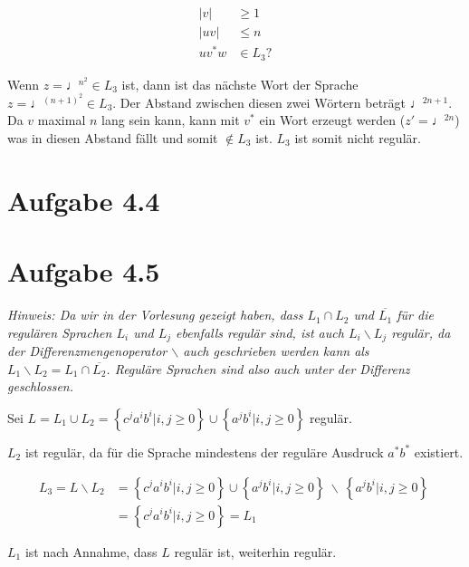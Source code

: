 \documentclass{article}
\begin{document}
\begin{align}
|v| &\geq 1\\
|uv| &\leq n\\
uv^*w &\in L_3 ?
\end{align}

Wenn $z=\quarternote^{n^2} \in L_3$ ist, dann ist das nächste Wort der Sprache $z=\quarternote^{(n+1)^2} \in L_3$. Der Abstand zwischen diesen zwei Wörtern beträgt $\quarternote^{2n+1}$. Da $v$ maximal $n$ lang sein kann, kann mit $v^*$ ein Wort erzeugt werden ($z'=\quarternote^{2n}$) was in diesen Abstand fällt und somit $\notin L_3$ ist. $L_3$ ist somit nicht regulär.



\section*{Aufgabe 4.4}



\section*{Aufgabe 4.5}
\textit{Hinweis: Da wir in der Vorlesung gezeigt haben, dass $L_1 \cap L_2$ und $\overline{L_1}$ für die regulären Sprachen $L_i$ und $L_j$ ebenfalls regulär sind, ist auch $L_i \backslash L_j$ regulär, da der Differenzmengenoperator $\backslash$ auch geschrieben werden kann als $L_1 \backslash L_2 = L_1 \cap \overline{L_2}$. Reguläre Sprachen sind also auch unter der Differenz geschlossen.}

\vspace{1em}

Sei $L = L_1 \cup L_2 = \left\{c^ja^ib^i | i,j \geq 0 \right\} \cup \left\{ a^jb^i |i,j \geq 0 \right\}$ regulär.

$L_2$ ist regulär, da für die Sprache mindestens der reguläre Ausdruck $a^*b^*$ existiert.

\begin{align*}
L_3 = L \backslash L_2 &= \left\{c^ja^ib^i | i,j \geq 0 \right\} \cup \left\{ a^jb^i |i,j \geq 0 \right\}\ \backslash\ \left\{ a^jb^i |i,j \geq 0 \right\}\ \\
                       &= \left\{c^ja^ib^i | i,j \geq 0 \right\} = L_1
\end{align*}

$L_1$ ist nach Annahme, dass $L$ regulär ist, weiterhin regulär. 

\vspace{1em}
\end{document}
